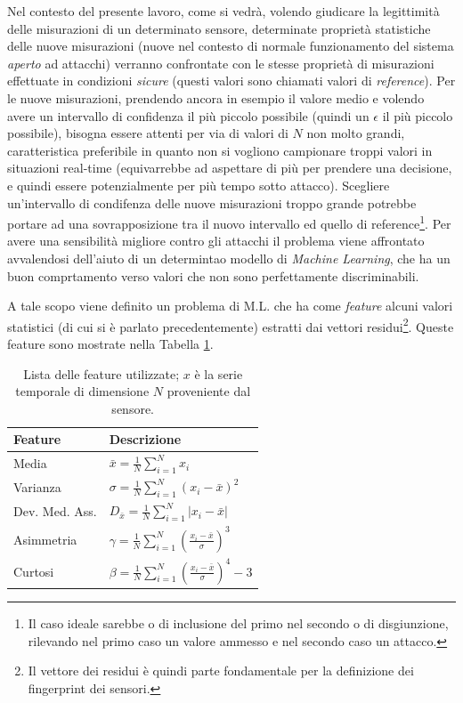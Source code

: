 \documentclass[Lau,binding=0.6cm]{sapthesis}
\begin{document}
Nel contesto del presente lavoro, come si vedr\`a, volendo giudicare la legittimit\`a delle misurazioni di un determinato sensore, determinate propriet\`a statistiche delle nuove misurazioni (nuove nel contesto di normale 
funzionamento del sistema \textit{aperto} ad attacchi) verranno confrontate con le stesse propriet\`a di misurazioni effettuate in condizioni \textit{sicure} (questi valori sono chiamati valori di \textit{reference}). 
Per le nuove misurazioni, prendendo ancora in esempio il valore medio e volendo avere un intervallo di confidenza il pi\`u piccolo possibile (quindi un $\epsilon$ il pi\`u piccolo possibile), bisogna essere attenti per via di valori di $N$ non molto grandi,
caratteristica preferibile in quanto non si vogliono campionare troppi valori in situazioni real-time (equivarrebbe ad aspettare di pi\`u per prendere una decisione, e quindi essere potenzialmente per più tempo sotto attacco).
Scegliere un'intervallo di condifenza delle nuove misurazioni troppo grande potrebbe portare ad una sovrapposizione tra il nuovo intervallo ed quello di reference\footnote{Il caso ideale sarebbe o di inclusione del primo nel secondo o di disgiunzione, rilevando nel primo caso un valore ammesso e nel secondo caso un attacco.}.
Per avere una sensibilit\`a migliore contro gli attacchi il problema viene affrontato avvalendosi dell'aiuto di un determintao modello di \textit{Machine Learning}, 
che ha un buon comprtamento verso valori che non sono perfettamente discriminabili.

A tale scopo viene definito un problema di M.L. che ha come \textit{feature} alcuni valori statistici (di cui si \`e parlato precedentemente) estratti dai vettori residui\footnote{Il vettore dei residui \`e quindi parte fondamentale per la definizione dei fingerprint dei sensori.}.
Queste feature sono mostrate nella Tabella \ref{tab:1}.

\begin{table}[tb]
    \begin{center}
        \begin{tabular}{|l|l|}
        \hline
        \textbf{Feature} & \textbf{Descrizione} \\
        \hline
        Media & $\bar{x} = \frac{1}{N}\sum_{i=1}^N x_i$ \\
        \hline
        Varianza & $\sigma = \frac{1}{N}\sum_{i=1}^N (x_i - \bar{x})^2 $ \\
        \hline
        Dev. Med. Ass. & $D_{\bar{x}} = \frac{1}{N}\sum_{i=1}^N |x_i - \bar{x}|$ \\
        \hline
        Asimmetria & $\gamma = \frac{1}{N} \sum_{i=1}^N (\frac{x_i - \bar{x}}{\sigma})^3 $ \\
        \hline
        Curtosi & $ \beta = \frac{1}{N} \sum_{i=1}^N (\frac{x_i - \bar{x}}{\sigma})^4 - 3$\\
        \hline
        \end{tabular}
    \end{center}
    \caption{Lista delle feature utilizzate; $x$ \`e la serie temporale di dimensione $N$ proveniente dal sensore.}
    \label{tab:1}
\end{table}
\end{document}
